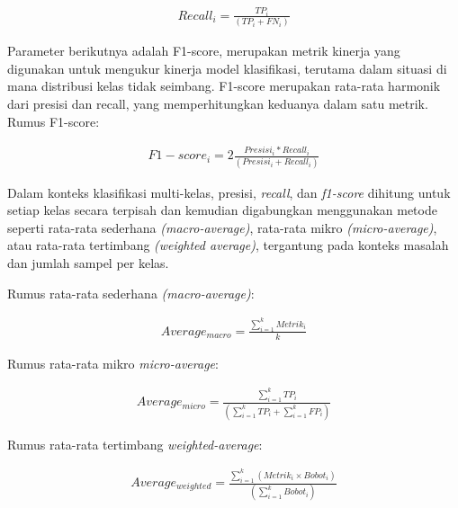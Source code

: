 \begin{equation}
	\begin{aligned}
		Recall_i =\frac{TP_i}{(TP_i+FN_i)}
	\end{aligned}
\end{equation}

Parameter berikutnya adalah F1-score, merupakan metrik kinerja yang digunakan untuk mengukur kinerja model klasifikasi, terutama dalam situasi di mana distribusi kelas tidak seimbang. F1-score merupakan rata-rata harmonik dari presisi dan recall, yang memperhitungkan keduanya dalam satu metrik. Rumus F1-score:

\begin{equation}
	\begin{aligned}
		F1-score_i =2 \frac{Presisi_i*Recall_i}{(Presisi_i +Recall_i)}
	\end{aligned}
\end{equation}

Dalam konteks klasifikasi multi-kelas, presisi, \textit{recall}, dan \textit{f1-score} dihitung untuk setiap kelas secara terpisah dan kemudian digabungkan menggunakan metode seperti rata-rata sederhana \textit{(macro-average)}, rata-rata mikro \textit{(micro-average)}, atau rata-rata tertimbang \textit{(weighted average)}, tergantung pada konteks masalah dan jumlah sampel per kelas. 

Rumus rata-rata sederhana \textit{(macro-average)}:

\begin{equation}
	\begin{aligned}
		Average_{macro} = \frac {\sum_{i=1}^{k}Metrik_i}{k}
	\end{aligned}
\end{equation}

Rumus rata-rata mikro \textit{micro-average}:

\begin{equation}
	\begin{aligned}
		Average_{micro} =\frac{\sum_{i=1}^{k}TP_i}{(\sum_{i=1}^{k}TP_i+\sum_{i=1}^{k}FP_i)}
	\end{aligned}
\end{equation}


Rumus rata-rata tertimbang \textit{weighted-average}:

\begin{equation}
	\begin{aligned}
		Average_{weighted} =\frac{\sum_{i=1}^{k}(Metrik_i\times Bobot_i)}{(\sum_{i=1}^{k}Bobot_i)}
	\end{aligned}
\end{equation}

